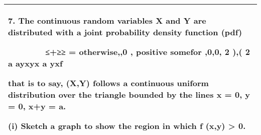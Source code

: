 \documentclass[a4paper,12pt]{article}
\begin{document}
 
 
  \begin{table}[ht!]
     \centering
     \begin{tabular}{|p{15cm}|}
     \hline

7. The continuous random variables X and Y are distributed with a joint probability density function (pdf) 
  
  
   
≤+≥≥
=
otherwise,,0
, positive somefor ,0,0,
2
),(
2 a ayxyx
a yxf 
 
 that is to say, (X,Y) follows a continuous uniform distribution over the triangle bounded by the lines  x = 0,  y = 0,  x+y = a. 
 
 (i) Sketch a graph to show the region in which f (x,y) > 0.         

\\ \hline  
      \end{tabular}
    \end{table}
\end{document}
